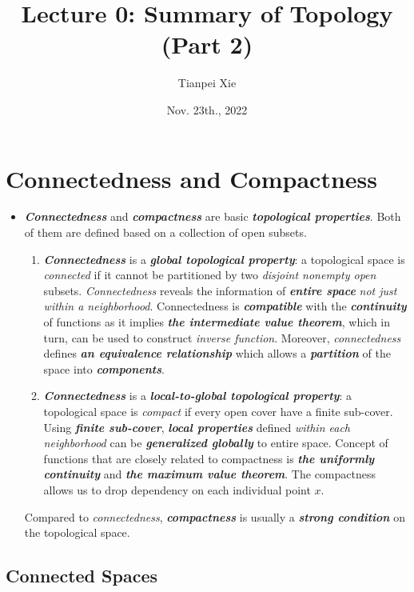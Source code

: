 \documentclass[11pt]{article}
\begin{document}
\title{Lecture 0: Summary of Topology (Part 2)}
\author{ Tianpei Xie}
\date{Nov. 23th., 2022}
\maketitle
\tableofcontents
\newpage
\section{Connectedness and Compactness}
\begin{itemize}
\item \begin{remark}
\emph{\textbf{Connectedness}} and \emph{\textbf{compactness}} are basic \emph{\textbf{topological properties}}. Both of them are defined based on a collection of open subsets. 
\begin{enumerate}
\item \emph{\textbf{Connectedness}} is a \emph{\textbf{global topological property}}: a topological space is \emph{connected} if it cannot be partitioned by two \emph{disjoint nonempty open} subsets. \emph{Connectedness} reveals the information of \emph{\textbf{entire space}} \emph{not just within a neighborhood}.  Connectedness is \emph{\textbf{compatible}} with the \emph{\textbf{continuity}} of functions as it implies \emph{\textbf{the intermediate value theorem}}, which in turn, can be used to construct \emph{inverse function}.  Moreover, \emph{connectedness} defines \emph{\textbf{an equivalence relationship}} which allows a \emph{\textbf{partition}} of the space into \emph{\textbf{components}}. 
\item \emph{\textbf{Connectedness}} is a \emph{\textbf{local-to-global topological property}}: a topological space is \emph{compact} if every open cover have a finite sub-cover. Using \emph{\textbf{finite sub-cover}}, \emph{\textbf{local properties}} defined \emph{within each neighborhood} can be \emph{\textbf{generalized globally}}  to entire space. Concept of functions that are closely related to compactness is \emph{\textbf{the uniformly continuity}} and \emph{\textbf{the maximum value theorem}}. The compactness allows us to drop dependency on each individual point $x$.
\end{enumerate}
Compared to \emph{connectedness}, \emph{\textbf{compactness}} is usually a \emph{\textbf{strong condition}} on the topological space.
\end{remark}
\end{itemize}
\subsection{Connected Spaces}
\end{document}
